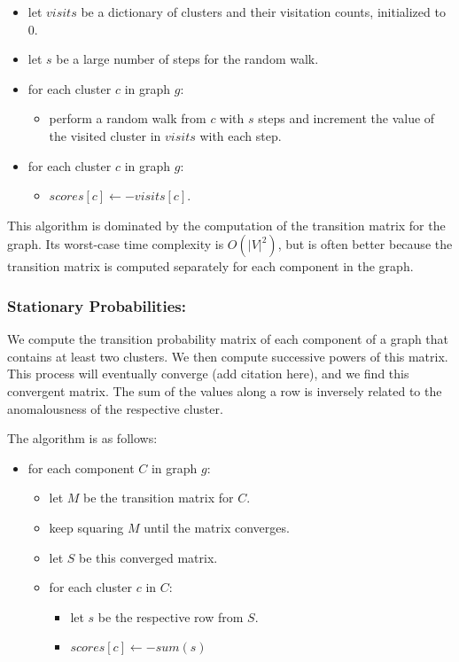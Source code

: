 \begin{itemize}
    \item let $visits$ be a dictionary of clusters and their visitation counts, initialized to $0$.
    \item let $s$ be a large number of steps for the random walk.
    \item for each cluster $c$ in graph $g$:
    \begin{itemize}
        \item perform a random walk from $c$ with $s$ steps and increment the value of the visited cluster in $visits$ with each step.
    \end{itemize}
    \item for each cluster $c$ in graph $g$:
    \begin{itemize}
        \item $scores[c] \leftarrow -visits[c]$.
    \end{itemize}
\end{itemize}

This algorithm is dominated by the computation of the transition matrix for the graph.
Its worst-case time complexity is $O(|V|^2)$, but is often better because the transition matrix is computed separately for each component in the graph.

\subsubsection{Stationary Probabilities:}
We compute the transition probability matrix of each component of a graph that contains at least two clusters.
We then compute successive powers of this matrix.
This process will eventually converge (add citation here), and we find this convergent matrix.
The sum of the values along a row is inversely related to the anomalousness of the respective cluster.

The algorithm is as follows:

\begin{itemize}
    \item for each component $C$ in graph $g$:
    \begin{itemize}
        \item let $M$ be the transition matrix for $C$.
        \item keep squaring $M$ until the matrix converges.
        \item let $S$ be this converged matrix.
        \item for each cluster $c$ in $C$:
        \begin{itemize}
            \item let $s$ be the respective row from $S$.
            \item $scores[c] \leftarrow -sum(s)$
        \end{itemize}
    \end{itemize}
\end{itemize}

